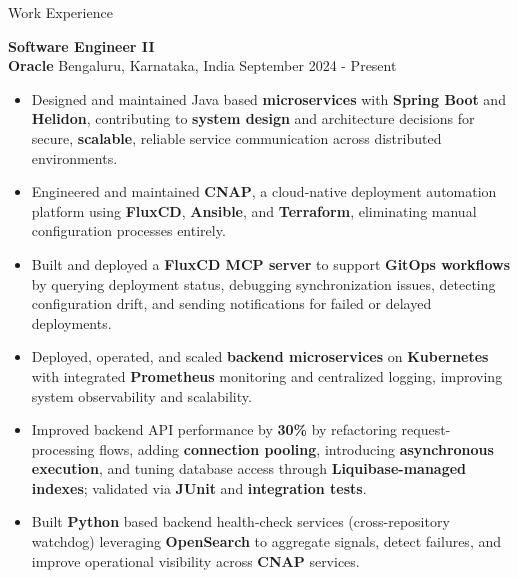 \documentclass{resume}
\begin{document}
\begin{rSection}{Work Experience}

\textbf{Software Engineer II} \\
\textbf{Oracle} \textbar{} Bengaluru, Karnataka, India \hspace*{\fill} September 2024 - Present
\vspace{-2pt}
\begin{itemize}
    \item Designed and maintained Java based \textbf{microservices} with \textbf{Spring Boot} and \textbf{Helidon}, contributing to \textbf{system design} and architecture decisions for secure, \textbf{scalable}, reliable service communication across distributed environments.
    \item Engineered and maintained \textbf{CNAP}, a cloud-native deployment automation platform using \textbf{FluxCD}, \textbf{Ansible}, and \textbf{Terraform}, eliminating manual configuration processes entirely.
    \item Built and deployed a \textbf{FluxCD MCP server} to support \textbf{GitOps workflows} by querying deployment status, debugging synchronization issues, detecting configuration drift, and sending notifications for failed or delayed deployments.
    \item Deployed, operated, and scaled \textbf{backend microservices} on \textbf{Kubernetes} with integrated \textbf{Prometheus} monitoring and centralized logging, improving system observability and scalability.
    \item Improved backend API performance by \textbf{30\%} by refactoring request-processing flows, adding \textbf{connection pooling}, introducing \textbf{asynchronous execution}, and tuning database access through \textbf{Liquibase-managed indexes}; validated via \textbf{JUnit} and \textbf{integration tests}.
    \item Built \textbf{Python} based backend health-check services (cross-repository watchdog) leveraging \textbf{OpenSearch} to aggregate signals, detect failures, and improve operational visibility across \textbf{CNAP} services.
\end{itemize}


\end{rSection}
\end{document}
